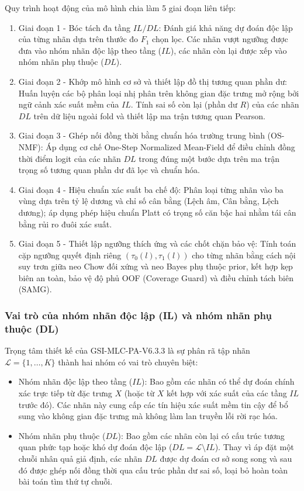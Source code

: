 \documentclass[11pt,a4paper]{article}
\begin{document}
Quy trình hoạt động của mô hình chia làm 5 giai đoạn liên tiếp:
\begin{enumerate}
  \item Giai đoạn 1 - Bóc tách đa tầng $IL/DL$: Đánh giá khả năng dự đoán độc lập của từng nhãn dựa trên thước đo $F_1$ chọn lọc. Các nhãn vượt ngưỡng được đưa vào nhóm nhãn độc lập theo tầng ($IL$), các nhãn còn lại được xếp vào nhóm nhãn phụ thuộc ($DL$).
  \item Giai đoạn 2 - Khớp mô hình cơ sở và thiết lập đồ thị tương quan phần dư: Huấn luyện các bộ phân loại nhị phân trên không gian đặc trưng mở rộng bởi ngữ cảnh xác suất mềm của $IL$. Tính sai số còn lại (phần dư $R$) của các nhãn $DL$ trên dữ liệu ngoài fold và thiết lập ma trận tương quan Pearson.
  \item Giai đoạn 3 - Ghép nối đồng thời bằng chuẩn hóa trường trung bình (OS-NMF): Áp dụng cơ chế One-Step Normalized Mean-Field để điều chỉnh đồng thời điểm logit của các nhãn $DL$ trong đúng một bước dựa trên ma trận trọng số tương quan phần dư đã lọc và chuẩn hóa.
  \item Giai đoạn 4 - Hiệu chuẩn xác suất ba chế độ: Phân loại từng nhãn vào ba vùng dựa trên tỷ lệ dương và chỉ số cân bằng (Lệch âm, Cân bằng, Lệch dương); áp dụng phép hiệu chuẩn Platt có trọng số căn bậc hai nhằm tái cân bằng rủi ro đuôi xác suất.
  \item Giai đoạn 5 - Thiết lập ngưỡng thích ứng và các chốt chặn bảo vệ: Tính toán cặp ngưỡng quyết định riêng $(\tau_0(l), \tau_1(l))$ cho từng nhãn bằng cách nội suy trơn giữa neo Chow đối xứng và neo Bayes phụ thuộc prior, kết hợp kẹp biên an toàn, bảo vệ độ phủ OOF (Coverage Guard) và điều chỉnh tách biên (SAMG).
\end{enumerate}

\subsubsection{Vai trò của nhóm nhãn độc lập (IL) và nhóm nhãn phụ thuộc (DL)}
Trọng tâm thiết kế của GSI-MLC-PA-V6.3.3 là sự phân rã tập nhãn $\mathcal{L} = \{1, \ldots, K\}$ thành hai nhóm có vai trò chuyên biệt:
\begin{itemize}
  \item Nhóm nhãn độc lập theo tầng ($IL$): Bao gồm các nhãn có thể dự đoán chính xác trực tiếp từ đặc trưng $X$ (hoặc từ $X$ kết hợp với xác suất của các tầng $IL$ trước đó). Các nhãn này cung cấp các tín hiệu xác suất mềm tin cậy để bổ sung vào không gian đặc trưng mà không làm lan truyền lỗi rời rạc hóa.
  \item Nhóm nhãn phụ thuộc ($DL$): Bao gồm các nhãn còn lại có cấu trúc tương quan phức tạp hoặc khó dự đoán độc lập ($DL = \mathcal{L} \setminus IL$). Thay vì áp đặt một chuỗi nhân quả giả định, các nhãn $DL$ được dự đoán cơ sở song song và sau đó được ghép nối đồng thời qua cấu trúc phần dư sai số, loại bỏ hoàn toàn bài toán tìm thứ tự chuỗi.
\end{itemize}
\end{document}
